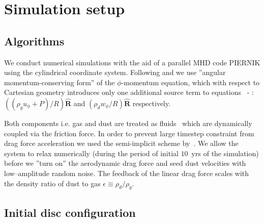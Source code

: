 \section[Simulation Setup]{Simulation setup}
\label{sec:setup}
\subsection{Algorithms}

We conduct numerical simulations with the aid of a parallel MHD code PIERNIK
using the cylindrical coordinate system. 
Following \cite{M07} and \cite{SO10} we use ''angular momentum-conserving form''
of the $\phi$-momentum equation, which with respect to Cartesian geometry
introduces only one additional source term to equations~ - :
$\left((\rho_g u_\phi + P) / R\right)\mathbf{\hat{R}}$ and $(\rho_d w_\phi / R)
\mathbf{\hat{R}}$ respectively.

Both components i.e. gas and dust are treated as fluids~\citep{piernik2} which
are dynamically coupled via the friction force. In order to prevent large
timestep constraint from drag force acceleration we used the semi-implicit
scheme by~\cite{TB09}. We allow the system to relax numerically (during the
period of initial $10$~yrs of the simulation) before we ''turn on'' the
aerodynamic drag force and seed dust velocities with low--amplitude random
noise. The feedback of the linear drag force scales with the density ratio of
dust to gas $\epsilon\equiv \rho_d/\rho_g$.

\subsection{Initial disc configuration}

